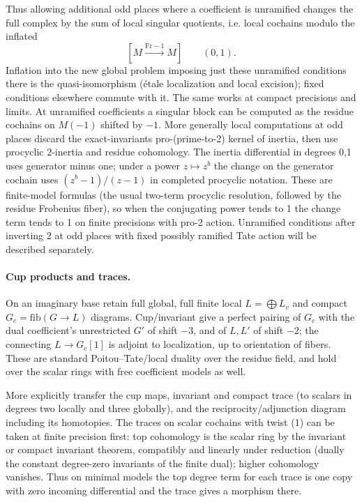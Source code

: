 Thus allowing additional odd places where a coefficient is unramified changes the full complex by the sum of local singular quotients, i.e. local cochains modulo the inflated
\[
                         [M\xrightarrow{\mathrm{Fr}-1}M]\qquad(0,1).
\]
Inflation into the new global problem imposing just these unramified conditions there is the quasi-isomorphism (étale localization and local excision); fixed conditions elsewhere commute with it. The same works at compact precisions and limits. At unramified coefficients a singular block can be computed as the residue cochains on \(M(-1)\) shifted by \(-1\). More generally local computations at odd places discard the exact-invariants pro-(prime-to-2) kernel of inertia, then use procyclic \(2\)-inertia and residue cohomology. The inertia differential in degrees 0,1 uses generator minus one; under a power \(z\mapsto z^b\) the change on the generator cochain uses \((z^b-1)/(z-1)\) in completed procyclic notation. These are finite-model formulas (the usual two-term procyclic resolution, followed by the residue Frobenius fiber), so when the conjugating power tends to 1 the change term tends to 1 on finite precisions with pro-2 action. Unramified conditions after inverting 2 at odd places with fixed possibly ramified Tate action will be described separately.

\paragraph{Cup products and traces.}
On an imaginary base retain full global, full finite local \(L=\bigoplus L_v\) and compact \(G_c=\mathrm{fib}(G\to L)\) diagrams. Cup/invariant give a perfect pairing of \(G_c\) with the dual coefficient's unrestricted \(G'\) of shift \(-3\), and of \(L,L'\) of shift \(-2\); the connecting \(L\to G_c[1]\) is adjoint to localization, up to orientation of fibers. These are standard Poitou--Tate/local duality over the residue field, and hold over the scalar rings with free coefficient models as well. 

More explicitly transfer the cup maps, invariant and compact trace (to scalars in degrees two locally and three globally), and the reciprocity/adjunction diagram including its homotopies. The traces on scalar cochains with twist (1) can be taken at finite precision first: top cohomology is the scalar ring by the invariant or compact invariant theorem, compatibly and linearly under reduction (dually the constant degree-zero invariants of the finite dual); higher cohomology vanishes. Thus on minimal models the top degree term for each trace is one copy with zero incoming differential and the trace gives a morphism there. 

